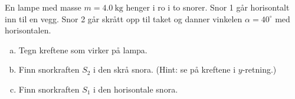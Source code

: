 %
En lampe med masse $m = \SI{4.0}{\kilo\gram}$ henger i ro i to snorer. Snor 1 går horisontalt inn til en vegg. Snor 2 går skrått opp til taket og danner vinkelen $\alpha = 40^\circ$ med horisontalen.
\begin{enumerate}[a)]
    \item Tegn kreftene som virker på lampa.
    \item Finn snorkraften $S_2$ i den skrå snora. (Hint: se på kreftene i $y$-retning.)
    \item Finn snorkraften $S_1$ i den horisontale snora.
\end{enumerate}
